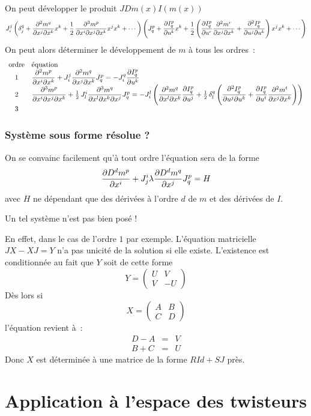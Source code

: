 \documentclass[a4paper,draft]{amsart}
\begin{document}
On peut développer le produit $JDm(x)I(m(x))$
\[
J^j_i
\left(
\delta^q_j + \dfrac{\partial^2{m^q}}{\partial{x^j}\partial{x^k}}x^k + \operatorname{\frac{1}{2}} \dfrac{\partial^3{m^p}}{\partial{x^i}\partial{x^j}\partial{x^k}}x^jx^k +\cdots
\right)
\left(
J^p_q + \dfrac{\partial{I^p_q}}{\partial{u^k}}x^k + \operatorname{\frac{1}{2}}\left( \dfrac{\partial{I^p_q}}{\partial{u^r}}\dfrac{\partial^2{m^r}}{\partial{x^j}\partial{x^k}} +\dfrac{\partial^2{I^p_q}}{\partial{u^j}\partial{u^k}}\right)x^jx^k +\cdots
\right)
\]
On peut alors déterminer le développement de $m$ à tous les ordres~:
\[
\begin{array}{cl}
\text{ordre} & \text{\'equation} \\  
1 & \dfrac{\partial^2{m^p}}{\partial{x^i}\partial{x^k}} + J^j_i\dfrac{\partial^2{m^q}}{\partial{x^j}\partial{x^k}}J^p_q = - J^q_i\dfrac{\partial{I^p_q}}{\partial{u^k}}
\\
2 & 
\dfrac{\partial^3{m^p}}{\partial{x^i}\partial{x^j}\partial{x^k}} + \operatorname{\frac{1}{2}} J^i_l \dfrac{\partial^3{m^q}}{\partial{x^l}\partial{x^k}\partial{x^j}}J^p_q = -J_i^l\left(
\dfrac{\partial^2{m^q}}{\partial{x^l}\partial{x^k}}\dfrac{\partial{I^p_q}}{\partial{u^j}} + \operatorname{\frac{1}{2}} \delta_l^q \left( 
\dfrac{\partial^2{I^p_q}}{\partial{u^j}\partial{u^k}} + \dfrac{\partial{I^p_q}}{\partial{u^t}}\dfrac{\partial^2{m^t}}{\partial{x^j}\partial{x^k}}
\right)
\right)
\\ 
3 & \\
\end{array} 
\]

\subsubsection*{Système sous forme résolue ?}
On se convainc facilement qu'à tout ordre l'équation sera de la forme
\[
\dfrac{\partial{D^dm^p}}{\partial{x^i}} + J^i_j \lambda \dfrac{\partial{D^dm^q}}{\partial{x^j}} J^p_q = H
\]
avec $H$ ne dépendant que des dérivées à l'ordre $d$ de $m$ et des dérivées de $I$.

Un tel système n'est pas bien posé !

En effet, dans le cas de l'ordre $1$ par exemple. L'équation matricielle $JX-XJ=Y$ n'a pas unicité de la solution si elle existe. L'existence est conditionnée au fait que $Y$ soit de cette forme
\[
Y = \begin{pmatrix}
U & V \\ 
V & -U
\end{pmatrix}
\]
Dès lors si
\[
X = \begin{pmatrix}
A & B \\ 
C & D
\end{pmatrix} \]
l'équation revient à~:
\begin{eqnarray*}
D-A & = & V\\
B+C & = & U
\end{eqnarray*}
Donc $X$ est déterminée à une matrice de la forme $R Id + S J$ près.

\section{Application à l'espace des twisteurs}
\end{document}
